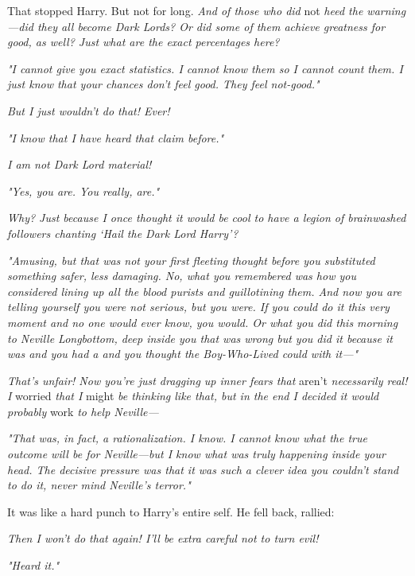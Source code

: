 That stopped Harry. But not for long. \emph{And of those who did} not \emph{
    heed the warning---did they \emph{all} become Dark Lords? Or did some of them
    achieve greatness for good, as well? Just what are the exact percentages here?}

\emph{"I cannot give you exact statistics. I cannot know them so I cannot count
them. I just know that your chances don't feel good. They feel 
not-good."}

\emph{But I just wouldn't do that! Ever!}

\emph{"I know that I have heard that claim before."}

\emph{I am not Dark Lord material!}

\emph{"Yes, you are. You really,  are."}

\emph{Why? Just because I once thought it would be cool to have a legion of
brainwashed followers chanting `Hail the Dark Lord Harry'?}

\emph{"Amusing, but that was not your first fleeting thought before you
substituted something safer, less damaging. No, what you remembered was how you
considered lining up all the blood purists and guillotining them. And now you
are telling yourself you were not serious, but you were. If you could do it
this very moment and no one would ever know, you would. Or what you did this
morning to Neville Longbottom, deep inside you  that was wrong but
you did it  because it was  and you had a  and you thought the Boy-Who-Lived could  with
it\mbox{---}"}

\emph{That's unfair! Now you're just dragging up inner fears that} aren't \emph{
    necessarily real! I} worried \emph{that I} might \emph{be thinking like that,
    but in the end I decided it would probably} work \emph{to help Neville---}

\emph{"That was, in fact, a rationalization. I know. I cannot know what the
true outcome will be for Neville---but I know what was truly happening inside
your head. The decisive pressure was that it was such a clever idea you
couldn't stand  to do it, never mind Neville's terror."}

It was like a hard punch to Harry's entire self. He fell back, rallied:

\emph{Then I won't do that again! I'll be extra careful not to turn evil!}

\emph{"Heard it."}

